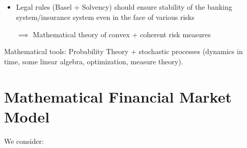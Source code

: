 \subsection*{}
\begin{itemize}
	
	\item Legal rules (Basel + Solvency) should ensure stability of the banking system/insurance system even in the face of various risks 
	
	$\implies$ Mathematical theory of convex + coherent risk measures 
\end{itemize}	 
Mathematical tools: Probability Theory + stochastic processes (dynamics in time, some linear algebra, optimization, measure theory).

\section*{Mathematical Financial Market Model}
We consider:
